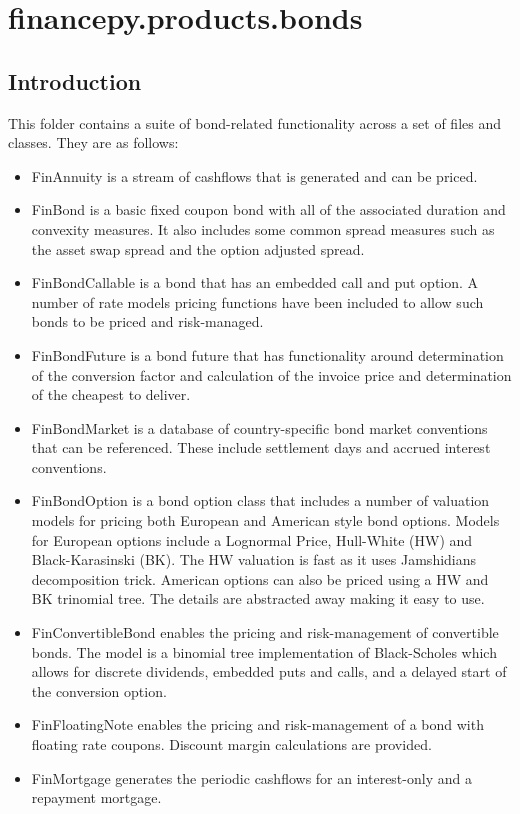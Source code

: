\documentclass[twoside,11pt]{book}
\begin{document}
\chapter{financepy.products.bonds}
\section{Introduction}

This folder contains a suite of bond-related functionality across a set of files and classes. They are as follows:

\begin{itemize}
\item{ FinAnnuity is a stream of cashflows that is generated and can be priced.
}
\item{ FinBond is a basic fixed coupon bond with all of the associated duration and convexity measures. It also includes some common spread measures such as the asset swap spread and the option adjusted spread.
}
\item{ FinBondCallable is a bond that has an embedded call and put option. A number of rate models pricing functions have been included to allow such bonds to be priced and risk-managed.
}
\item{ FinBondFuture is a bond future that has functionality around determination of the conversion factor and calculation of the invoice price and determination of the cheapest to deliver. 
}
\item{ FinBondMarket is a database of country-specific bond market conventions that can be referenced. These include settlement days and accrued interest conventions.
}
\item{ FinBondOption is a bond option class that includes a number of valuation models for pricing both European and American style bond options. Models for European options include a Lognormal Price, Hull-White (HW) and Black-Karasinski (BK). The HW valuation is fast as it uses Jamshidians decomposition trick. American options can also be priced using a HW and BK trinomial tree. The details are abstracted away making it easy to use.
}
\item{ FinConvertibleBond enables the pricing and risk-management of convertible bonds. The model is a binomial tree implementation of Black-Scholes which allows for discrete dividends, embedded puts and calls, and a delayed start of the conversion option.
}
\item{ FinFloatingNote enables the pricing and risk-management of a bond with floating rate coupons. Discount margin calculations are provided.
}
\item{ FinMortgage generates the periodic cashflows for an interest-only and a repayment mortgage. }
\end{itemize}
\newpage
\end{document}

